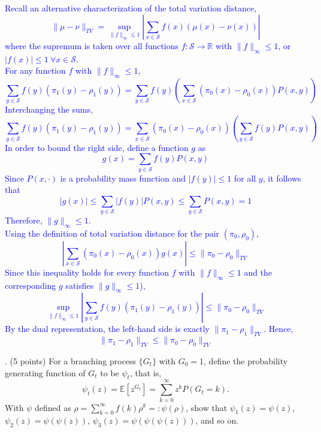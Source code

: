 \documentclass{article}
\begin{document}
\textcolor{blue}{
    Recall an alternative characterization of the total variation distance,
\[
\|\mu-\nu\|_{TV} = \sup_{\|f\|_\infty \le 1} \left| \sum_{x\in \mathcal{S}} f(x)(\mu(x)-\nu(x)) \right|
\]
where the supremum is taken over all functions \(f:\mathcal{S}\to\mathbb{R}\) with \(\|f\|_\infty \le 1\), or \(|f(x)| \le 1 \ \forall x\in \mathcal{S}\). \\ 
For any function \(f\) with \(\|f\|_\infty \le 1\),
\[
\sum_{y\in\mathcal{S}} f(y)\left(\pi_1(y)-\rho_1(y)\right) 
=\sum_{y\in\mathcal{S}} f(y) \left( \sum_{x\in\mathcal{S}} (\pi_0(x)-\rho_0(x)) P(x,y) \right)
\]
Interchanging the sums,
\[
\sum_{y\in\mathcal{S}} f(y)\left(\pi_1(y)-\rho_1(y)\right) 
=\sum_{x\in\mathcal{S}} (\pi_0(x)-\rho_0(x)) \left( \sum_{y\in\mathcal{S}} f(y)P(x,y) \right)
\]
In order to bound the right side, define a function \( g \) as
\[
g(x) = \sum_{y\in\mathcal{S}} f(y)P(x,y)
\]
Since \(P(x,\cdot)\) is a probability mass function and \(|f(y)| \le 1\) for all \(y\), it follows that
\[
|g(x)| \le \sum_{y\in\mathcal{S}} |f(y)| P(x,y) \le \sum_{y\in\mathcal{S}} P(x,y) = 1
\]
Therefore, \(\|g\|_\infty \le 1\). \\ 
Using the definition of total variation distance for the pair \((\pi_0, \rho_0)\), 
\[
\left|\sum_{x\in\mathcal{S}} (\pi_0(x)-\rho_0(x))g(x)\right| \le \|\pi_0-\rho_0\|_{TV}
\]
Since this inequality holds for every function \(f\) with \(\|f\|_\infty \le 1\) and the corresponding \(g\) satisfies \(\|g\|_\infty \le 1\)),
\[
\sup_{\|f\|_\infty \le 1} \left|\sum_{y\in\mathcal{S}} f(y)\left(\pi_1(y)-\rho_1(y)\right)\right| \le \|\pi_0-\rho_0\|_{TV}
\]
By the dual representation, the left-hand side is exactly \(\|\pi_1-\rho_1\|_{TV}\). Hence,
\[
\|\pi_1-\rho_1\|_{TV} \le \|\pi_0-\rho_0\|_{TV}
\]
}

. (5 points) For a branching process $\{G_t\}$ with $G_0 = 1$, define the probability generating function of $G_t$ to be $\psi_t$, that is,
\[
\psi_t(z) = \mathbb{E}[z^{G_t}] = \sum_{k=0}^{\infty} z^k P(G_t = k).
\]
With $\psi$ defined as $\rho = \sum_{k=0}^{\infty}f(k)\rho^k =: \psi(\rho)$, show that $\psi_1(z) = \psi(z)$, $\psi_2(z) = \psi(\psi(z))$, $\psi_3(z) = \psi(\psi(\psi(z)))$, and so on.
\end{document}

